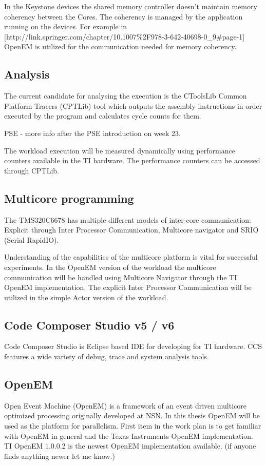 In the Keystone devices the shared memory controller doesn't maintain memory coherency between the Cores. The coherency is managed by the application running on the devices. For example in [http://link.springer.com/chapter/10.1007\%2F978-3-642-40698-0\_9\#page-1] OpenEM is utilized for the communication needed for memory coherency.

\subsection{Analysis}
The current candidate for analysing the execution is the CToolsLib Common Platform Tracers (CPTLib) tool which outputs the assembly instructions in order executed by the program and calculates cycle counts for them.

PSE - more info after the PSE introduction on week 23.

The workload execution will be measured dynamically using performance counters available in the TI hardware. The performance counters can be accessed through CPTLib.

\subsection{Multicore programming}
The TMS320C6678 has multiple different models of inter-core communication: Explicit through Inter Processor Communication, Multicore navigator and SRIO (Serial RapidIO).

Understanding of the capabilities of the multicore platform is vital for successful experiments. In the OpenEM version of the workload the multicore communication will be handled using Multicore Navigator through the TI OpenEM implementation. The explicit Inter Processor Communication will be utilized in the simple Actor version of the workload.

\subsection{Code Composer Studio v5 / v6}
Code Composer Studio is Eclipse based IDE for developing for TI hardware. CCS features a wide variety of debug, trace and system analysis tools.

\subsection{OpenEM}
Open Event Machine (OpenEM) is a framework of an event driven multicore optimized processing originally developed at NSN. In this thesis OpenEM will be used as the platform for parallelism. First item in the work plan is to get familiar with OpenEM in general and the Texas Instruments OpenEM implementation. TI OpenEM 1.0.0.2 is the newest OpenEM implementation available. (if anyone finds anything newer let me know.)

